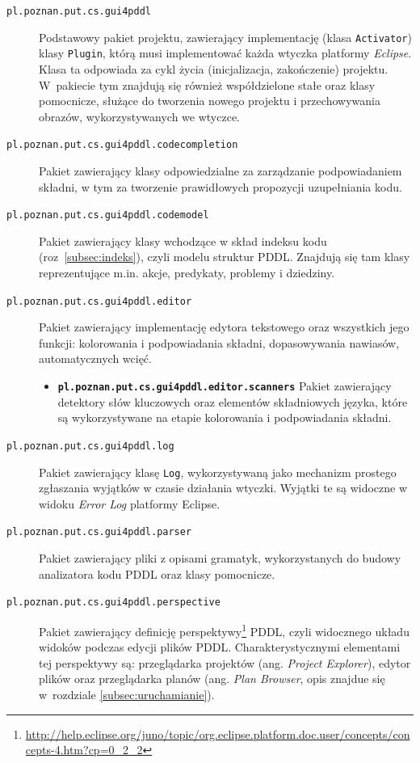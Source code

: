 \begin{description}
\item [\texttt{pl.poznan.put.cs.gui4pddl}] Podstawowy pakiet projektu, zawierający implementację (klasa \texttt{Activator}) klasy \texttt{Plugin}, którą musi implementować każda wtyczka platformy \emph{Eclipse}. Klasa ta odpowiada za cykl życia (inicjalizacja, zakończenie) projektu. W~pakiecie tym znajdują się również współdzielone stałe oraz klasy pomocnicze, służące do tworzenia nowego projektu i przechowywania obrazów, wykorzystywanych we wtyczce.
\item [\texttt{pl.poznan.put.cs.gui4pddl.codecompletion}] Pakiet zawierający klasy odpowiedzialne za zarządzanie podpowiadaniem składni, w tym za tworzenie prawidłowych propozycji uzupełniania kodu.
\item [\texttt{pl.poznan.put.cs.gui4pddl.codemodel}] Pakiet zawierający klasy wchodzące w skład indeksu kodu (roz~\ref{subsec:indeks}), czyli modelu struktur PDDL. Znajdują się tam klasy reprezentujące m.in. akcje, predykaty, problemy i dziedziny.
\item [\texttt{pl.poznan.put.cs.gui4pddl.editor}] Pakiet zawierający implementację edytora tekstowego oraz wszystkich jego funkcji: kolorowania i podpowiadania składni, dopasowywania nawiasów, automatycznych wcięć.
\begin{itemize}
\item \texttt{\textbf{pl.poznan.put.cs.gui4pddl.editor.scanners}} Pakiet zawierający detektory słów kluczowych oraz elementów składniowych języka, które są wykorzystywane na etapie kolorowania i podpowiadania składni.
\end{itemize}
\item [\texttt{pl.poznan.put.cs.gui4pddl.log}] Pakiet zawierający klasę \texttt{Log}, wykorzystywaną jako mechanizm prostego zgłaszania wyjątków w czasie działania wtyczki. Wyjątki te są widoczne w widoku \textit{Error Log} platformy Eclipse.
\item [\texttt{pl.poznan.put.cs.gui4pddl.parser}] Pakiet zawierający pliki z opisami gramatyk, wykorzystanych do budowy analizatora kodu PDDL oraz klasy pomocnicze.
\item [\texttt{pl.poznan.put.cs.gui4pddl.perspective}] Pakiet zawierający definicję perspektywy\footnote{\url{http://help.eclipse.org/juno/topic/org.eclipse.platform.doc.user/concepts/concepts-4.htm?cp=0_2_2}} PDDL, czyli widocznego układu widoków podczas edycji plików PDDL. Charakterystycznymi elementami tej perspektywy są: przeglądarka projektów (ang. \textit{Project Explorer}), edytor plików oraz przeglądarka planów (ang. \textit{Plan Browser}, opis znajdue się w~rozdziale \ref{subsec:uruchamianie}).

\end{description}

